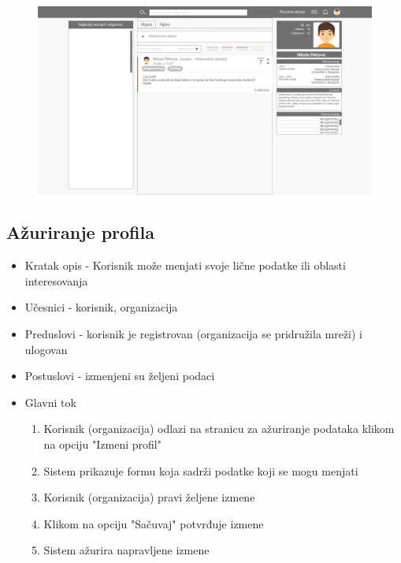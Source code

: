 \begin{figure}[h]
		\centerline{\includegraphics[scale=0.3]{slike/profil.png}}
\end{figure}

\clearpage

\subsection{Ažuriranje profila}
\begin{itemize}
	\item Kratak opis - Korisnik može menjati svoje lične podatke ili oblasti interesovanja
	\item Učesnici - korisnik, organizacija
	\item Preduslovi - korisnik je registrovan (organizacija se pridružila mreži) i ulogovan
	\item Postuslovi - izmenjeni su željeni podaci
	\item Glavni tok
	\begin{enumerate}
		\item Korisnik (organizacija) odlazi na stranicu za ažuriranje podataka klikom na opciju "Izmeni profil"
		\item Sistem prikazuje formu koja sadrži podatke koji se mogu menjati
		\item Korisnik (organizacija) pravi željene izmene
		\item Klikom na opciju "Sačuvaj" potvrđuje izmene
		\item Sistem ažurira napravljene izmene
	\end{enumerate}
\end{itemize}

